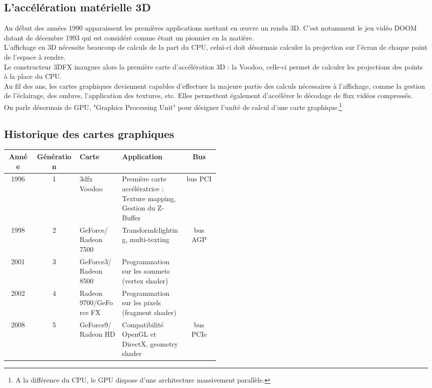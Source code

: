 \subsection{L'accélération matérielle 3D}
Au début des années 1990 apparaissent les premières applications mettant en œuvre un rendu 3D. C'est notamment le jeu vidéo DOOM datant de décembre 1993 qui est considéré comme étant un pionnier en la matière.\\
L'affichage en 3D nécessite beaucoup de calculs de la part du CPU, celui-ci doit désormais calculer la projection sur l'écran de chaque point de l'espace à rendre.\\
Le constructeur 3DFX inaugure alors la première carte d'accélération 3D : la Voodoo, celle-ci permet de calculer les projections des points à la place du CPU.\\
Au fil des ans, les cartes graphiques deviennent capables d'effectuer la majeure partie des calculs nécessaires à l'affichage,  comme la gestion de l'éclairage, des ombres, l'application des textures, etc. Elles permettent
également d'accélérer le décodage de flux vidéos compressés.\\
On parle désormais de GPU, "Graphics Processing Unit" pour désigner l'unité de calcul d'une carte graphique.\footnote{A la différence du CPU, le GPU dispose d'une architecture massivement parallèle.}

\subsection{Historique des cartes graphiques}
\begin{center}
\begin{tabular}{|c|c|m{0.2\linewidth}|m{0.3\linewidth} |c|}
\hline
Année & Génération & Carte & Application & Bus \\
\hline
1996 & 1 & 3dfx Voodoo & Première carte accélératrice : Texture mapping, Gestion du Z-Buffer & bus PCI\\
\hline
1998 & 2 & GeForce/ Radeon 7500 & Transform\&lighting, multi-texting & bus AGP \\
\cline{1-4}
2001 & 3 & GeForce3/ Radeon 8500 & Programmation sur les sommets (vertex shader)	& \\
\cline{1-4}
2002 & 4 & Radeon 9700/GeForce FX & Programmation sur les pixels (fragment shader)	& \\
\hline
2008 & 5 & GeForce9/ Radeon HD & Compatibilité OpenGL et DirectX,  geometry shader & bus PCIe \\
\hline
\end{tabular}
\end{center}

